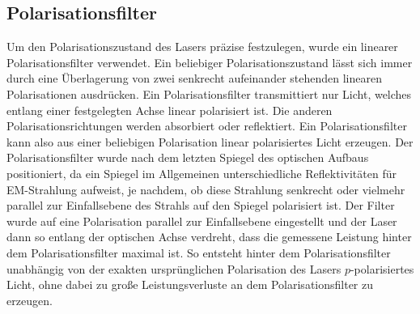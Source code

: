 \documentclass[a4paper, titlepage,  ngerman, fullpage]{book}
\begin{document}
	\subsection{Polarisationsfilter}	
	Um den Polarisationszustand des Lasers präzise festzulegen, wurde ein linearer Polarisationsfilter verwendet. Ein beliebiger Polarisationszustand lässt sich immer durch eine Überlagerung von zwei senkrecht aufeinander stehenden linearen Polarisationen ausdrücken. Ein Polarisationsfilter transmittiert nur Licht, welches entlang einer festgelegten Achse linear polarisiert ist. Die anderen Polarisationsrichtungen werden absorbiert oder reflektiert. Ein Polarisationsfilter kann also aus einer beliebigen Polarisation linear polarisiertes Licht erzeugen. Der  Polarisationsfilter wurde nach dem letzten Spiegel des optischen Aufbaus positioniert, da ein Spiegel im Allgemeinen unterschiedliche Reflektivitäten für EM-Strahlung aufweist, je nachdem, ob diese Strahlung senkrecht oder vielmehr parallel zur Einfallsebene des Strahls auf den Spiegel polarisiert ist. Der Filter wurde auf eine Polarisation parallel zur Einfallsebene eingestellt und der Laser dann so entlang der optischen Achse verdreht, dass die gemessene Leistung hinter dem Polarisationsfilter maximal ist. So entsteht hinter dem Polarisationsfilter unabhängig  von der exakten ursprünglichen Polarisation des Lasers $p$-polarisiertes Licht, ohne dabei zu große Leistungsverluste an dem Polarisationsfilter zu erzeugen.\cite{Hecht.2018}
\end{document}
